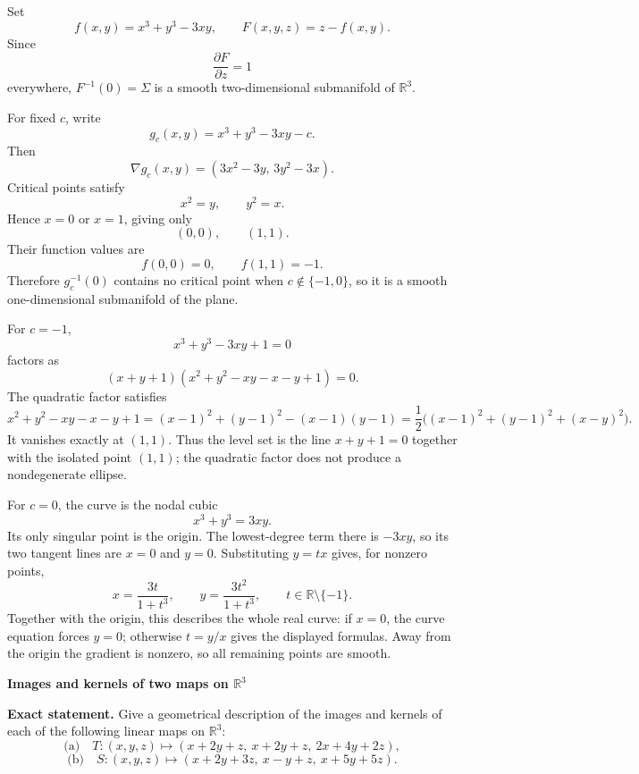 \begin{solution}
Set
\[
f(x,y)=x^3+y^3-3xy,
\qquad
F(x,y,z)=z-f(x,y).
\]
Since
\[
\frac{\partial F}{\partial z}=1
\]
everywhere, \(F^{-1}(0)=\Sigma\) is a smooth two-dimensional submanifold of \(\mathbb R^3\).

For fixed \(c\), write
\[
g_c(x,y)=x^3+y^3-3xy-c.
\]
Then
\[
\nabla g_c(x,y)=(3x^2-3y,\,3y^2-3x).
\]
Critical points satisfy
\[
x^2=y,\qquad y^2=x.
\]
Hence \(x=0\) or \(x=1\), giving only
\[
(0,0),\qquad(1,1).
\]
Their function values are
\[
f(0,0)=0,\qquad f(1,1)=-1.
\]
Therefore \(g_c^{-1}(0)\) contains no critical point when \(c\notin\{-1,0\}\), so it is a smooth
one-dimensional submanifold of the plane.

For \(c=-1\),
\[
x^3+y^3-3xy+1=0
\]
factors as
\[
(x+y+1)(x^2+y^2-xy-x-y+1)=0.
\]
The quadratic factor satisfies
\[
x^2+y^2-xy-x-y+1
=(x-1)^2+(y-1)^2-(x-1)(y-1)
=\frac12\bigl((x-1)^2+(y-1)^2+(x-y)^2\bigr).
\]
It vanishes exactly at \((1,1)\). Thus the level set is the line
\(x+y+1=0\) together with the isolated point \((1,1)\); the quadratic factor does not
produce a nondegenerate ellipse.

For \(c=0\), the curve is the nodal cubic
\[
x^3+y^3=3xy.
\]
Its only singular point is the origin. The lowest-degree term there is \(-3xy\),
so its two tangent lines are \(x=0\) and \(y=0\). Substituting \(y=tx\) gives,
for nonzero points,
\[
x=\frac{3t}{1+t^3},\qquad y=\frac{3t^2}{1+t^3},\qquad t\in\mathbb R\setminus\{-1\}.
\]
Together with the origin, this describes the whole real curve: if \(x=0\), the
curve equation forces \(y=0\); otherwise \(t=y/x\) gives the displayed formulas.
Away from the origin the gradient is nonzero, so all remaining points are smooth.
\end{solution}

\begin{problem}[CP-I-0014]
\label{prob:cp-i-0014}
\textbf{Images and kernels of two maps on $\mathbb R^3$}

\textbf{Exact statement.}
\hspace*{1.5em}Give a geometrical description of the images and kernels of each of the following linear maps on $\mathbb R^3$:
\[
\text{(a)}\quad T:(x,y,z)\mapsto (x+2y+z,\ x+2y+z,\ 2x+4y+2z),
\]
\[
\text{(b)}\quad S:(x,y,z)\mapsto (x+2y+3z,\ x-y+z,\ x+5y+5z).
\]

\end{problem}

